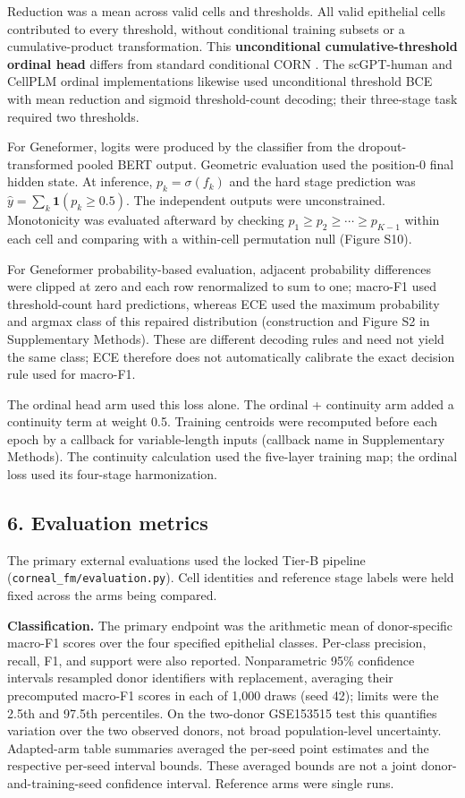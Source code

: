 \documentclass[12pt,letterpaper]{article}
\begin{document}
Reduction was a mean across valid cells and thresholds. All valid epithelial cells contributed to every threshold, without conditional training subsets or a cumulative-product transformation. This \textbf{unconditional cumulative-threshold ordinal head} differs from standard conditional CORN \cite{shi2023corn,onc2025}. The scGPT-human and CellPLM ordinal implementations likewise used unconditional threshold BCE with mean reduction and sigmoid threshold-count decoding; their three-stage task required two thresholds.

For Geneformer, logits were produced by the classifier from the dropout-transformed pooled BERT output. Geometric evaluation used the position-0 final hidden state. At inference, $p_k=\sigma(f_k)$ and the hard stage prediction was $\hat y=\sum_k\mathbf 1(p_k\ge0.5)$. The independent outputs were unconstrained. Monotonicity was evaluated afterward by checking $p_1\ge p_2\ge\cdots\ge p_{K-1}$ within each cell and comparing with a within-cell permutation null (Figure S10).

For Geneformer probability-based evaluation, adjacent probability differences were clipped at zero and each row renormalized to sum to one; macro-F1 used threshold-count hard predictions, whereas ECE used the maximum probability and argmax class of this repaired distribution (construction and Figure S2 in Supplementary Methods). These are different decoding rules and need not yield the same class; ECE therefore does not automatically calibrate the exact decision rule used for macro-F1.

The ordinal head arm used this loss alone. The ordinal + continuity arm added a continuity term at weight 0.5. Training centroids were recomputed before each epoch by a callback for variable-length inputs (callback name in Supplementary Methods). The continuity calculation used the five-layer training map; the ordinal loss used its four-stage harmonization.

\subsection*{6. Evaluation metrics}

The primary external evaluations used the locked Tier-B pipeline (\texttt{corneal\_\allowbreak fm/\allowbreak evaluation.py}). Cell identities and reference stage labels were held fixed across the arms being compared.

\textbf{Classification.} The primary endpoint was the arithmetic mean of donor-specific macro-F1 scores over the four specified epithelial classes. Per-class precision, recall, F1, and support were also reported. Nonparametric 95\% confidence intervals resampled donor identifiers with replacement, averaging their precomputed macro-F1 scores in each of 1,000 draws (seed 42); limits were the 2.5th and 97.5th percentiles. On the two-donor GSE153515 test this quantifies variation over the two observed donors, not broad population-level uncertainty. Adapted-arm table summaries averaged the per-seed point estimates and the respective per-seed interval bounds. These averaged bounds are not a joint donor-and-training-seed confidence interval. Reference arms were single runs.
\end{document}
